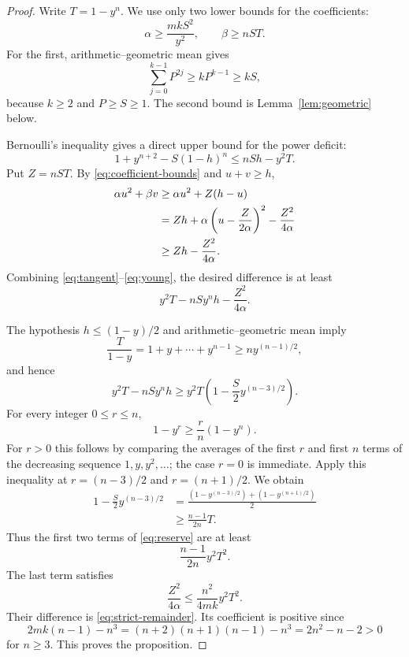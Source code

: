 \documentclass[11pt]{article}
\theoremstyle{remark}
\begin{document}
\begin{proof}
Write $T=1-y^n$. We use only two lower bounds for the coefficients:
\begin{equation}\label{eq:coefficient-bounds}
 \alpha\ge\frac{mkS^2}{y^2},\qquad
 \beta\ge nST.
\end{equation}
For the first, arithmetic--geometric mean gives
\[
 \sum_{j=0}^{k-1}P^{2j}\ge kP^{k-1}\ge kS,
\]
because $k\ge2$ and $P\ge S\ge1$. The second bound is Lemma~\ref{lem:geometric} below.

Bernoulli's inequality gives a direct upper bound for the power deficit:
\begin{equation}\label{eq:tangent}
 1+y^{n+2}-S(1-h)^n\le nSh-y^2T.
\end{equation}
Put $Z=nST$. By \eqref{eq:coefficient-bounds} and $u+v\ge h$,
\begin{align}\label{eq:young}
 \alpha u^2+\beta v
 &\ge \alpha u^2+Z(h-u)\notag\\
 &=Zh+\alpha\left(u-\frac{Z}{2\alpha}\right)^2
                      -\frac{Z^2}{4\alpha}\notag\\
 &\ge Zh-\frac{Z^2}{4\alpha}.
\end{align}
Combining \eqref{eq:tangent}--\eqref{eq:young}, the desired difference is at least
\begin{equation}\label{eq:reserve}
 y^2T-nS y^n h-\frac{Z^2}{4\alpha}.
\end{equation}

The hypothesis $h\le(1-y)/2$ and arithmetic--geometric mean imply
\[
 \frac{T}{1-y}=1+y+\cdots+y^{n-1}\ge ny^{(n-1)/2},
\]
and hence
\begin{equation}\label{eq:remaining-term}
 y^2T-nS y^n h
 \ge y^2T\left(1-\frac S2 y^{(n-3)/2}\right).
\end{equation}
For every integer $0\le r\le n$,
\[
 1-y^r\ge\frac rn(1-y^n).
\]
For $r>0$ this follows by comparing the averages of the first $r$ and first $n$ terms of the decreasing sequence $1,y,y^2,\ldots$; the case $r=0$ is immediate. Apply this inequality at $r=(n-3)/2$ and $r=(n+1)/2$. We obtain
\begin{align*}
 1-\frac S2y^{(n-3)/2}
 &=\frac{(1-y^{(n-3)/2})+(1-y^{(n+1)/2})}{2}\\
 &\ge\frac{n-1}{2n}T.
\end{align*}
Thus the first two terms of \eqref{eq:reserve} are at least
\[
 \frac{n-1}{2n}y^2T^2.
\]
The last term satisfies
\[
 \frac{Z^2}{4\alpha}\le\frac{n^2}{4mk}y^2T^2.
\]
Their difference is \eqref{eq:strict-remainder}. Its coefficient is positive since
\[
 2mk(n-1)-n^3
 =(n+2)(n+1)(n-1)-n^3=2n^2-n-2>0
\]
for $n\ge3$. This proves the proposition.
\end{proof}
\end{document}
